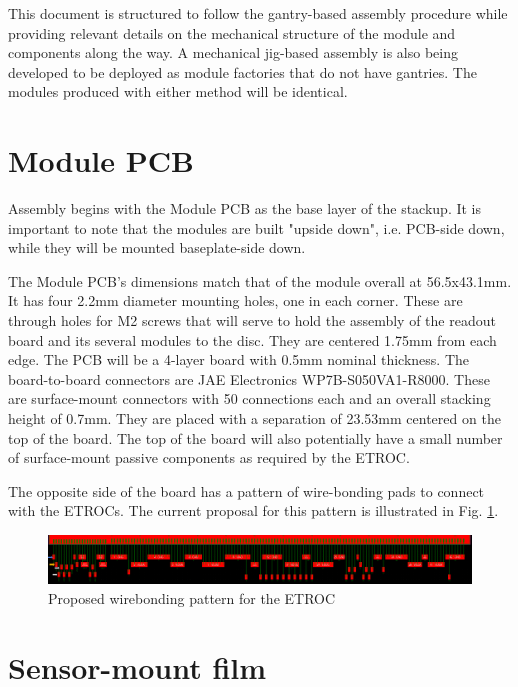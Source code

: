 \documentclass[10pt]{datasheet}
\begin{document}
This document is structured to follow the gantry-based assembly procedure while providing relevant details on the mechanical structure of the module and components along the way. A mechanical jig-based assembly is also being developed to be deployed as module factories that do not have gantries. The modules produced with either method will be identical.


\section{Module PCB}

Assembly begins with the Module PCB as the base layer of the stackup. It is important to note that the modules are built "upside down", i.e. PCB-side down, while they will be mounted baseplate-side down.

The Module PCB's dimensions match that of the module overall at 56.5x43.1mm. It has four 2.2mm diameter mounting holes, one in each corner. These are through holes for M2 screws that will serve to hold the assembly of the readout board and its several modules to the disc. They are centered 1.75mm from each edge. The PCB will be a 4-layer board with 0.5mm nominal thickness. The board-to-board connectors are JAE Electronics WP7B-S050VA1-R8000. These are surface-mount connectors with 50 connections each and an overall stacking height of 0.7mm. They are placed with a separation of 23.53mm centered on the top of the board. The top of the board will also potentially have a small number of surface-mount passive components as required by the ETROC.

The opposite side of the board has a pattern of wire-bonding pads to connect with the ETROCs. The current proposal for this pattern is illustrated in Fig. \ref{fig:wirebonding-pattern}.

\begin{figure}[h]
    \includegraphics[width=\textwidth]{figures/wirebonding-pattern.png}
    \caption{Proposed wirebonding pattern for the ETROC}
    \label{fig:wirebonding-pattern}	
\end{figure}

\section{Sensor-mount film}
\end{document}
